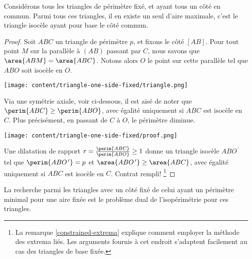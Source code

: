 \begin{fact} \label{tri-one-side-fixed}
	Considérons tous les triangles de périmètre fixé, et ayant tous un côté en commun.
	Parmi tous ces triangles, il en existe un seul d'aire maximale, c'est le triangle isocèle ayant pour base le côté commun.
\end{fact}


\begin{proof}
	Soit $ABC$ un triangle de périmètre $p$, et fixons le côté $[AB]$. 
	Pour tout point $M$ sur la parallèle à $(AB)$ passant par $C$, nous savons que $\area{ABM} = \area{ABC}$. Notons alors $O$ le point sur cette parallèle tel que $ABO$ soit isocèle en $O$.

	\begin{center}
		\texttt{[image: content/triangle-one-side-fixed/triangle.png]}
	\end{center}

	
	Via une symétrie axiale, voir ci-dessous, il est aisé de noter que $\perim{ABC} \geq \perim{ABO}$, avec égalité uniquement si $ABC$ est isocèle en $C$.
	Plus précisément, en passant de $C$ à $O$, le périmètre diminue.
	
	\begin{center}
		\texttt{[image: content/triangle-one-side-fixed/proof.png]}
	\end{center}
	
	Une dilatation  de rapport $r = \frac{\perim{ABC}}{\perim{ABO}} \geq 1$ donne un triangle isocèle $ABO^{\,\prime}$ tel que 
	$\perim{ABO^{\,\prime}} = p$
	et 
	$\area{ABO^{\,\prime}} \geq \area{ABC}$, avec égalité uniquement si $ABC$ est isocèle en $C$. 
	Contrat rempli!%
	\footnote{
		La remarque \ref{constrained-extrema} explique comment employer la méthode des extrema liés. 
		Les arguments fournis à cet endroit s'adaptent facilement au cas des triangles de base fixée.
	}
\end{proof}




\begin{remark}
	La recherche parmi les triangles avec un côté fixé de celui ayant un périmètre minimal pour une aire fixée est le problème dual de l'isopérimétrie pour ces triangles.
\end{remark}
